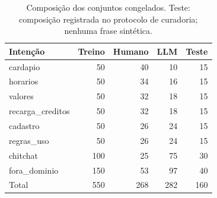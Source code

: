\begin{table}[!htb]
\centering
\caption{Composição dos conjuntos congelados. Teste: composição registrada no protocolo de curadoria; nenhuma frase sintética.}
\label{tab:dados}
\begin{tabular}{lrrrr}
\toprule Intenção & Treino & Humano & LLM & Teste\\ \midrule
cardapio & 50 & 40 & 10 & 15\\
horarios & 50 & 34 & 16 & 15\\
valores & 50 & 32 & 18 & 15\\
recarga\_creditos & 50 & 32 & 18 & 15\\
cadastro & 50 & 26 & 24 & 15\\
regras\_uso & 50 & 26 & 24 & 15\\
chitchat & 100 & 25 & 75 & 30\\
fora\_dominio & 150 & 53 & 97 & 40\\
\midrule Total & 550 & 268 & 282 & 160\\ \bottomrule
\end{tabular}
\end{table}
